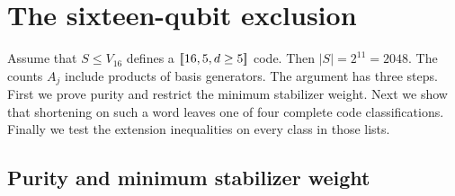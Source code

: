 \section{The sixteen-qubit exclusion}\label{sec:sixteen}

Assume that \(S\leq V_{16}\) defines a \([\![16,5,d\geq5]\!]\) code.
Then \(|S|=2^{11}=2048\). The counts \(A_j\) include products of basis generators.
The argument has three steps. First we prove purity and restrict the
minimum stabilizer weight. Next we show that shortening on such a word
leaves one of four complete code classifications. Finally we test the
extension inequalities on every class in those lists.

\subsection{Purity and minimum stabilizer weight}

